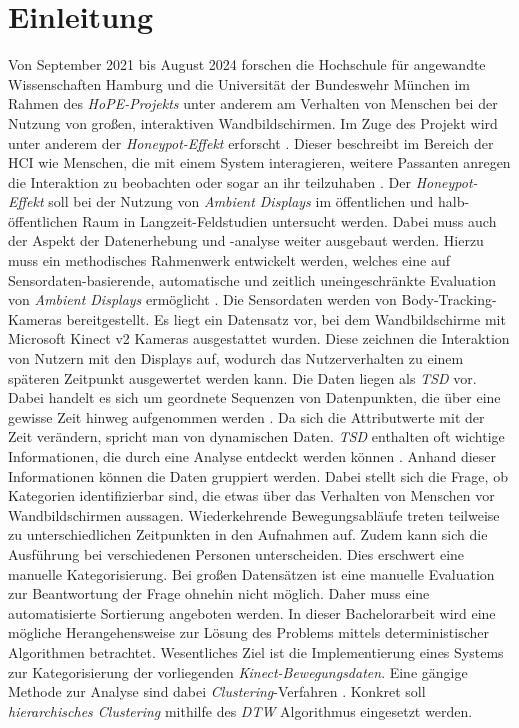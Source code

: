 \chapter{Einleitung}
\label{chapter1}
Von September 2021 bis August 2024 forschen die Hochschule für angewandte Wissenschaften Hamburg
und die Universität der Bundeswehr München im Rahmen des \emph{HoPE-Projekts} unter anderem am Verhalten
von Menschen bei der Nutzung von großen, interaktiven Wandbildschirmen.
Im Zuge des Projekt wird unter anderem der \emph{Honeypot-Effekt} erforscht \citep{unibw_honeypot-effekt_2021}.
Dieser beschreibt im Bereich der \ac{HCI} wie Menschen, die mit einem System interagieren,
weitere Passanten anregen die Interaktion zu beobachten oder sogar an ihr teilzuhaben \citep{wouters_uncovering_2016}.
Der \emph{Honeypot-Effekt} soll bei der Nutzung von \emph{Ambient Displays} im öffentlichen
und halb-öffentlichen Raum in Langzeit-Feldstudien untersucht werden.
Dabei muss auch der Aspekt der Datenerhebung und -analyse weiter ausgebaut werden.
Hierzu muss ein methodisches Rahmenwerk entwickelt werden, welches eine auf Sensordaten-basierende,
automatische und zeitlich uneingeschränkte Evaluation von \emph{Ambient Displays} ermöglicht \citep{unibw_honeypot-effekt_2021}.
Die Sensordaten werden von Body-Tracking-Kameras bereitgestellt.
Es liegt ein Datensatz vor, bei dem Wandbildschirme mit Microsoft Kinect v2 Kameras ausgestattet wurden.
Diese zeichnen die Interaktion von Nutzern mit den Displays auf,
wodurch das Nutzerverhalten zu einem späteren Zeitpunkt ausgewertet werden kann.
Die Daten liegen als \emph{\ac{TSD}} vor.
Dabei handelt es sich um geordnete Sequenzen von Datenpunkten,
die über eine gewisse Zeit hinweg aufgenommen werden \citep{ali_clustering_2019}.
Da sich die Attributwerte mit der Zeit verändern, spricht man von dynamischen Daten.
\emph{\ac{TSD}} enthalten oft wichtige Informationen, die durch eine Analyse entdeckt werden können \citep{ali_clustering_2019}.
Anhand dieser Informationen können die Daten gruppiert werden.
Dabei stellt sich die Frage, ob Kategorien identifizierbar sind,
die etwas über das Verhalten von Menschen vor Wandbildschirmen aussagen.
Wiederkehrende Bewegungsabläufe treten teilweise zu unterschiedlichen Zeitpunkten in den Aufnahmen auf.
Zudem kann sich die Ausführung bei verschiedenen Personen unterscheiden.
Dies erschwert eine manuelle Kategorisierung.
Bei großen Datensätzen ist eine manuelle Evaluation zur Beantwortung der Frage ohnehin nicht möglich.
Daher muss eine automatisierte Sortierung angeboten werden.
In dieser Bachelorarbeit wird eine mögliche Herangehensweise zur Lösung des Problems mittels deterministischer Algorithmen betrachtet.
Wesentliches Ziel ist die Implementierung eines Systems zur Kategorisierung der vorliegenden \emph{Kinect-Bewegungsdaten}.
Eine gängige Methode zur Analyse sind dabei \emph{Clustering}-Verfahren \citep{aghabozorgi_time-series_2015}.
Konkret soll \emph{hierarchisches Clustering} mithilfe des \emph{\ac{DTW}} Algorithmus eingesetzt werden.

